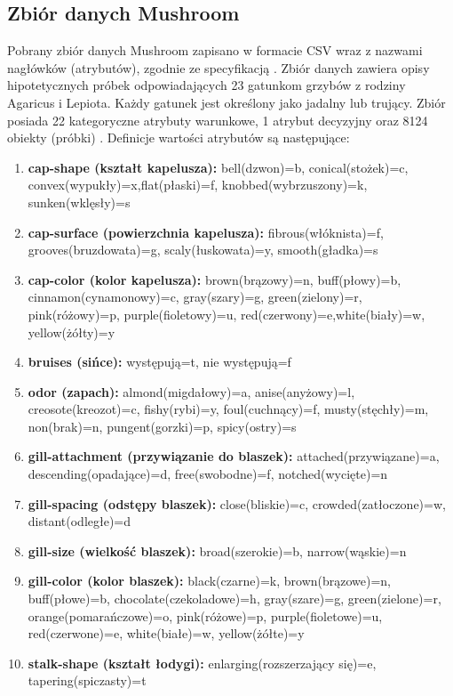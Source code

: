 \documentclass[10pt,a4paper]{article}
\begin{document}
\subsection{Zbiór danych Mushroom}
Pobrany zbiór danych Mushroom zapisano w formacie CSV wraz z nazwami nagłówków (atrybutów), zgodnie ze specyfikacją . Zbiór danych zawiera opisy hipotetycznych próbek odpowiadających 23 gatunkom grzybów z rodziny Agaricus i Lepiota. Każdy gatunek jest określony jako jadalny lub trujący. Zbiór posiada 22 kategoryczne atrybuty warunkowe, 1 atrybut decyzyjny oraz 8124 obiekty (próbki) \cite{MushroomDS}. Definicje wartości atrybutów są następujące:
\begin{flushleft}
	\begin{enumerate}
		\item \textbf{cap-shape (kształt kapelusza):} bell(dzwon)=b, conical(stożek)=c, convex(wypukły)=x,flat(płaski)=f, knobbed(wybrzuszony)=k, sunken(wklęsły)=s
		\item \textbf{cap-surface (powierzchnia kapelusza):} fibrous(włóknista)=f, grooves(bruzdowata)=g, scaly(łuskowata)=y, smooth(gładka)=s
		\item \textbf{cap-color (kolor kapelusza):} brown(brązowy)=n, buff(płowy)=b, cinnamon(cynamonowy)=c, gray(szary)=g, green(zielony)=r, pink(różowy)=p, purple(fioletowy)=u, red(czerwony)=e,white(biały)=w, yellow(żółty)=y
		\item \textbf{bruises (sińce):} występują=t, nie występują=f
		\item \textbf{odor (zapach):} almond(migdałowy)=a, anise(anyżowy)=l, creosote(kreozot)=c, fishy(rybi)=y, foul(cuchnący)=f, musty(stęchły)=m, non(brak)=n, pungent(gorzki)=p, spicy(ostry)=s
		\item \textbf{gill-attachment (przywiązanie do blaszek):} attached(przywiązane)=a, descending(opadające)=d, free(swobodne)=f, notched(wycięte)=n
		\item \textbf{gill-spacing (odstępy blaszek):} close(bliskie)=c, crowded(zatłoczone)=w, distant(odległe)=d
		\item \textbf{gill-size (wielkość blaszek):} broad(szerokie)=b, narrow(wąskie)=n
		\item \textbf{gill-color (kolor blaszek):} black(czarne)=k, brown(brązowe)=n, buff(płowe)=b, chocolate(czekoladowe)=h, gray(szare)=g, green(zielone)=r, orange(pomarańczowe)=o, pink(różowe)=p, purple(fioletowe)=u, red(czerwone)=e, white(białe)=w, yellow(żółte)=y
		\item \textbf{stalk-shape (kształt łodygi):} enlarging(rozszerzający się)=e, tapering(spiczasty)=t

\end{enumerate}
\end{flushleft}
\end{document}
